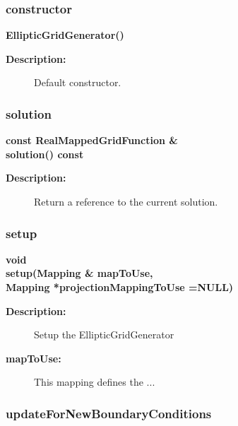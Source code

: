 \subsubsection{constructor}
 
\newlength{\EllipticGridGeneratorIncludeArgIndent}
\begin{flushleft} \textbf{%
\settowidth{\EllipticGridGeneratorIncludeArgIndent}{EllipticGridGenerator(}%
EllipticGridGenerator()
}\end{flushleft}
\begin{description}
\item[{\bf Description:}] 
   Default constructor.

\end{description}
\subsubsection{solution}
 
\begin{flushleft} \textbf{%
const RealMappedGridFunction \&  \\ 
\settowidth{\EllipticGridGeneratorIncludeArgIndent}{solution(}%
solution() const
}\end{flushleft}
\begin{description}
\item[{\bf Description:}] 
     Return a reference to the current solution.
\end{description}
\subsubsection{setup}
 
\begin{flushleft} \textbf{%
void  \\ 
\settowidth{\EllipticGridGeneratorIncludeArgIndent}{setup(}%
setup(Mapping \& mapToUse, \\ 
\hspace{\EllipticGridGeneratorIncludeArgIndent}Mapping *projectionMappingToUse  =NULL)
}\end{flushleft}
\begin{description}
\item[{\bf Description:}] 
     Setup the EllipticGridGenerator
\item[{\bf mapToUse:}]  This mapping defines the ...
\end{description}
\subsubsection{updateForNewBoundaryConditions}
 

